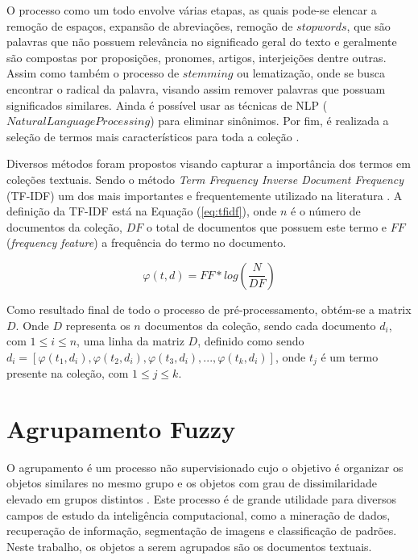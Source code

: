 O processo como um todo envolve várias etapas, as quais pode-se elencar a remoção de espaços,
expansão de abreviações, remoção de $stopwords$, que são palavras que não possuem relevância no
significado geral do texto e geralmente são compostas por proposições, pronomes, artigos,
interjeições dentre outras\cite{Nogueira2013}. Assim como também o processo de $stemming$ ou
lematização, onde se busca encontrar o radical da palavra, visando assim remover palavras que
possuam significados similares. Ainda é possível usar as técnicas de NLP ($Natural Language
Processing$) para eliminar sinônimos. Por fim, é realizada a seleção de termos mais característicos
para toda a coleção \cite{Haddi2013}. 

Diversos métodos foram propostos visando capturar a importância dos termos em coleções textuais.
Sendo o método { \it Term Frequency Inverse Document Frequency\/ }(TF-IDF) um dos mais importantes e
frequentemente utilizado na literatura \cite{Haddi2013}. A definição da TF-IDF está na Equação
(\ref{eq:tfidf}), onde $n$ é o número de documentos da coleção, $DF$ o total de documentos que
possuem este termo e $FF$ ({\it frequency feature}) a frequência do termo no documento.

\begin{equation} 
  \varphi(t,d) = FF * log(\frac{N}{DF}) \label{eq:tfidf} 
\end{equation}

Como resultado final de todo o processo de pré-processamento, obtém-se a matrix $D$. Onde $D$
representa os $n$ documentos da coleção, sendo cada documento $d_{i}$, com $1 \leq i \leq n$, uma
linha da matriz $D$, definido como sendo $ d_{i} =
[\varphi(t_{1},d_{i}),\varphi(t_{2},d_{i}),\varphi(t_{3},d_{i}),...,\varphi(t_{k},d_{i})] $, onde
$t_{j}$ é um termo presente na coleção, com $1 \leq j \leq k$.

\section{Agrupamento Fuzzy} 

O agrupamento é um processo não supervisionado cujo o objetivo é organizar os objetos similares no
mesmo grupo e os objetos com grau de dissimilaridade elevado em grupos distintos
\cite{Nogueira2013}. Este processo é de grande utilidade para diversos campos de estudo da
inteligência computacional, como a mineração de dados, recuperação de informação, segmentação de
imagens e classificação de padrões. Neste trabalho, os objetos a serem agrupados são os documentos
textuais.

